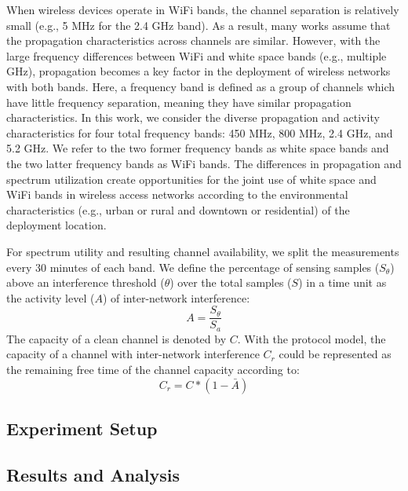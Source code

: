 When wireless devices operate in WiFi bands, the channel separation is relatively 
small (e.g., 5 MHz for the 2.4 GHz band). As a result, many works assume that
the propagation characteristics across channels are similar. However, with the
large frequency differences between WiFi and white space bands (e.g., multiple GHz),
propagation becomes a key factor in the deployment of wireless networks with both bands.
Here, a frequency band is defined as a group of channels which have
little frequency separation, meaning they have similar propagation characteristics.
In this work, we consider the diverse propagation and activity characteristics
for four total frequency bands: 450 MHz, 800 MHz, 2.4 GHz, and 5.2 GHz.
We refer to the two former frequency bands as white space bands and
the two latter frequency bands as WiFi bands.
The differences in propagation and spectrum utilization create opportunities
for the joint use of white space and WiFi bands in wireless access networks according
to the environmental characteristics (e.g., urban or rural and downtown or residential)
of the deployment location.


For spectrum utility and resulting channel availability, 
we split the measurements every 30 minutes of each band.  We define the percentage of sensing 
samples ($S_\theta$) above an interference threshold ($\theta$) over the total samples ($S$) in 
a time unit as the activity level ($A$) of inter-network interference:
\begin{equation}
\label{eq:actdef}
A=\frac{S_\theta}{S_a}
\end{equation}
The capacity of a clean channel is denoted by $C$. With the protocol model, the capacity 
of a channel with inter-network interference $C_r$ could be represented as 
the remaining free time of the channel capacity according to: 
\begin{equation}
\label{eq:intercap}
C_r=C*(1-\bar{A})
\end{equation}





\subsection{Experiment Setup}
\label{subsec:experimentsetup}
















\subsection{Results and Analysis}
\label{subsec:results}



